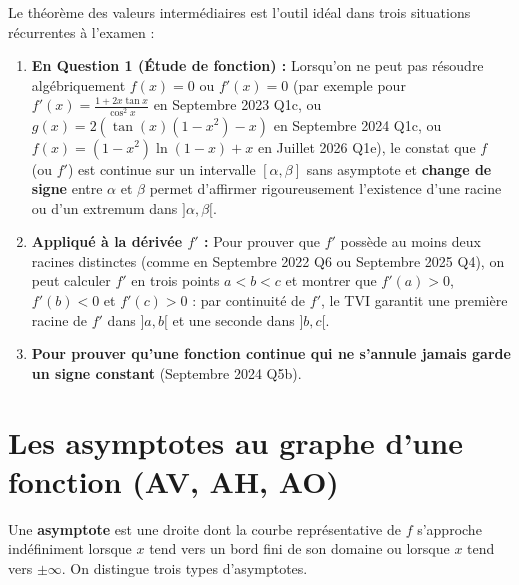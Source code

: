 \begin{astuce}
Le théorème des valeurs intermédiaires est l'outil idéal dans trois situations récurrentes à l'examen :
\begin{enumerate}
    \item \textbf{En Question 1 (Étude de fonction) :} Lorsqu'on ne peut pas résoudre algébriquement $f(x) = 0$ ou $f'(x) = 0$ (par exemple pour $f'(x) = \frac{1 + 2x\tan x}{\cos^2 x}$ en Septembre 2023 Q1c, ou $g(x) = 2(\tan(x)(1-x^2)-x)$ en Septembre 2024 Q1c, ou $f(x) = (1-x^2)\ln(1-x)+x$ en Juillet 2026 Q1e), le constat que $f$ (ou $f'$) est continue sur un intervalle $[\alpha, \beta]$ sans asymptote et \textbf{change de signe} entre $\alpha$ et $\beta$ permet d'affirmer rigoureusement l'existence d'une racine ou d'un extremum dans $]\alpha, \beta[$.
    \item \textbf{Appliqué à la dérivée $f'$ :} Pour prouver que $f'$ possède au moins deux racines distinctes (comme en Septembre 2022 Q6 ou Septembre 2025 Q4), on peut calculer $f'$ en trois points $a < b < c$ et montrer que $f'(a) > 0$, $f'(b) < 0$ et $f'(c) > 0$ : par continuité de $f'$, le TVI garantit une première racine de $f'$ dans $]a, b[$ et une seconde dans $]b, c[$.
    \item \textbf{Pour prouver qu'une fonction continue qui ne s'annule jamais garde un signe constant} (Septembre 2024 Q5b).
\end{enumerate}
\end{astuce}

\section{Les asymptotes au graphe d'une fonction (AV, AH, AO)}

Une \textbf{asymptote} est une droite dont la courbe représentative de $f$ s'approche indéfiniment lorsque $x$ tend vers un bord fini de son domaine ou lorsque $x$ tend vers $\pm\infty$. On distingue trois types d'asymptotes.

